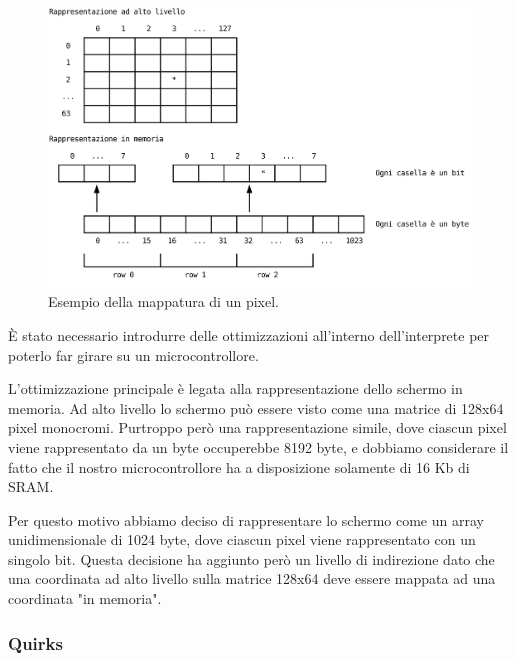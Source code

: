\documentclass[a4paper]{article}
\begin{document}
\begin{figure}
    \begin{center}
        \includegraphics[scale=0.50]{figures/screenopt.pdf}
    \end{center}
    \caption{Esempio della mappatura di un pixel.}
    \label{fig:screenopt}
\end{figure}


È stato necessario introdurre delle ottimizzazioni all'interno
dell'interprete per poterlo far girare su un microcontrollore.

L'ottimizzazione principale è legata alla rappresentazione
dello schermo in memoria. Ad alto livello lo schermo può essere
visto come una matrice di 128x64 pixel monocromi. Purtroppo però
una rappresentazione simile, dove ciascun pixel viene rappresentato
da un byte occuperebbe 8192 byte, e dobbiamo considerare il fatto
che il nostro microcontrollore ha a disposizione solamente di 16 Kb
di SRAM.

Per questo motivo abbiamo deciso di rappresentare lo schermo come
un array unidimensionale di 1024 byte, dove ciascun pixel viene
rappresentato con un singolo bit. Questa decisione ha aggiunto però
un livello di indirezione dato che una coordinata ad alto livello
sulla matrice 128x64 deve essere mappata ad una coordinata
"in memoria".

\subsubsection{Quirks}


\end{document}
